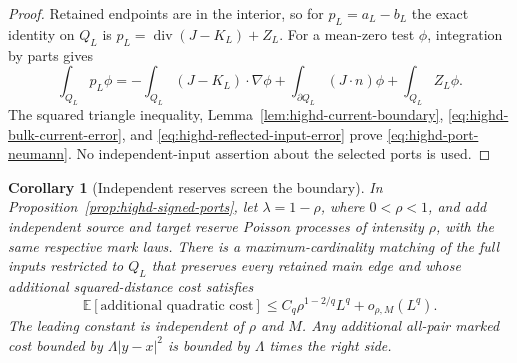 \documentclass[11pt,reqno]{amsart}
\newtheorem{corollary}[theorem]{Corollary}
\theoremstyle{definition}
\theoremstyle{remark}
\numberwithin{equation}{section}
\newcommand{\E}{\mathbb E}
\begin{document}
\begin{proof}
Retained endpoints are in the interior, so for \(p_L=a_L-b_L\) the
exact identity on \(Q_L\) is
\(p_L=\operatorname{div}(J-K_L)+Z_L\).
For a mean-zero test \(\phi\), integration by parts gives
\[
 \int_{Q_L}p_L\phi
 =-\int_{Q_L}(J-K_L)\cdot\nabla\phi
       +\int_{\partial Q_L}(J\cdot n)\phi+\int_{Q_L}Z_L\phi.
\]
The squared triangle inequality, Lemma~\ref{lem:highd-current-boundary},
\eqref{eq:highd-bulk-current-error}, and
\eqref{eq:highd-reflected-input-error} prove
\eqref{eq:highd-port-neumann}. No independent-input assertion about
the selected ports is used.
\end{proof}

\begin{corollary}[Independent reserves screen the boundary]
\label{cor:highd-kinetic-screening}
In Proposition~\ref{prop:highd-signed-ports}, let \(\lambda=1-\rho\),
where \(0<\rho<1\), and add independent source and target reserve
Poisson processes of intensity \(\rho\), with the same respective mark
laws. There is a maximum-cardinality
matching of the full inputs restricted to \(Q_L\) that preserves every
retained main edge and whose additional squared-distance cost satisfies
\begin{equation}
\label{eq:highd-kinetic-screening}
 \E[\text{additional quadratic cost}]
       \le C_q\rho^{1-2/q}L^q+o_{\rho,M}(L^q).
\end{equation}
The leading constant is independent of \(\rho\) and \(M\). Any
additional all-pair marked cost bounded by \(\Lambda|y-x|^2\) is bounded
by \(\Lambda\) times the right side.
\end{corollary}
\end{document}
